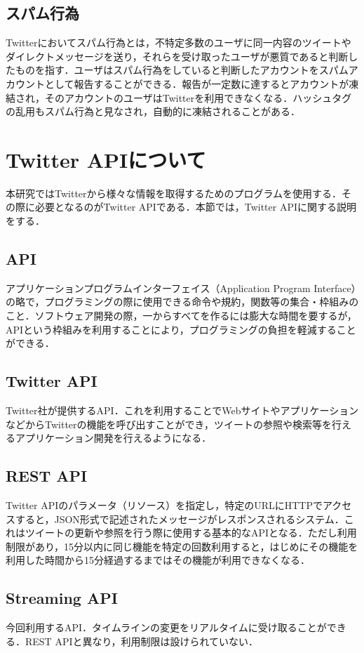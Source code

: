\subsection{スパム行為}
Twitterにおいてスパム行為とは，不特定多数のユーザに同一内容のツイートやダイレクトメッセージを送り，それらを受け取ったユーザが悪質であると判断したものを指す．ユーザはスパム行為をしていると判断したアカウントをスパムアカウントとして報告することができる．報告が一定数に達するとアカウントが凍結され，そのアカウントのユーザはTwitterを利用できなくなる．ハッシュタグの乱用もスパム行為と見なされ，自動的に凍結されることがある．

\section{Twitter APIについて}
本研究ではTwitterから様々な情報を取得するためのプログラムを使用する．その際に必要となるのがTwitter APIである．本節では，Twitter APIに関する説明をする．

\subsection{API}
アプリケーションプログラムインターフェイス（Application Program Interface）の略で，プログラミングの際に使用できる命令や規約，関数等の集合・枠組みのこと．ソフトウェア開発の際，一からすべてを作るには膨大な時間を要するが，APIという枠組みを利用することにより，プログラミングの負担を軽減することができる\cite{whatsapi}．

\subsection{Twitter API}
Twitter社が提供するAPI．これを利用することでWebサイトやアプリケーションなどからTwitterの機能を呼び出すことができ，ツイートの参照や検索等を行えるアプリケーション開発を行えるようになる\cite{whatstwitterapi}．

\subsection{REST API}
Twitter APIのパラメータ（リソース）を指定し，特定のURLにHTTPでアクセスすると，JSON形式で記述されたメッセージがレスポンスされるシステム．これはツイートの更新や参照を行う際に使用する基本的なAPIとなる．ただし利用制限があり，15分以内に同じ機能を特定の回数利用すると，はじめにその機能を利用した時間から15分経過するまではその機能が利用できなくなる．

\subsection{Streaming API}
今回利用するAPI．タイムラインの変更をリアルタイムに受け取ることができる．REST APIと異なり，利用制限は設けられていない．

